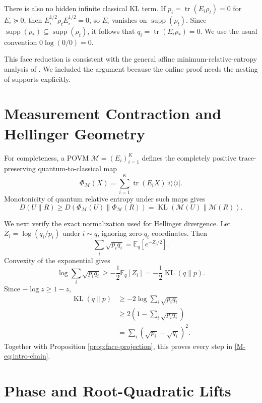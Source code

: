 \documentclass[twoside]{article}
\newcommand{\M}{\mathcal M}
\newcommand{\tr}{\operatorname{tr}}
\newcommand{\supp}{\operatorname{supp}}
\newcommand{\KL}{\operatorname{KL}}
\begin{document}
There is also no hidden infinite classical KL term. If $p_i=\tr(E_i\rho_t)=0$ for $E_i\succeq0$, then $E_i^{1/2}\rho_tE_i^{1/2}=0$, so $E_i$ vanishes on $\supp(\rho_t)$. Since $\supp(\rho_*)\subseteq\supp(\rho_t)$, it follows that $q_i=\tr(E_i\rho_*)=0$. We use the usual convention $0\log(0/0)=0$.

This face reduction is consistent with the general affine minimum-relative-entropy analysis of \citet{zorzi2014minimum}. We included the argument because the online proof needs the nesting of supports explicitly.

\section{Measurement Contraction and Hellinger Geometry}
\label{app:hellinger}

For completeness, a POVM $\M=(E_i)_{i=1}^K$ defines the completely positive trace-preserving quantum-to-classical map
\begin{equation}
\Phi_{\M}(X)=\sum_{i=1}^K\tr(E_iX)|i\rangle\langle i|.
\end{equation}
Monotonicity of quantum relative entropy under such maps gives
\begin{equation}
D(U\|R)\geq D(\Phi_{\M}(U)\|\Phi_{\M}(R))
=\KL(\M(U)\|\M(R)).
\end{equation}

We next verify the exact normalization used for Hellinger divergence. Let $Z_i=\log(q_i/p_i)$ under $i\sim q$, ignoring zero-$q_i$ coordinates. Then
\begin{equation}
\sum_i\sqrt{p_iq_i}=\mathbb E_q[e^{-Z_i/2}].
\end{equation}
Convexity of the exponential gives
\begin{equation}
\log\sum_i\sqrt{p_iq_i}\geq-\frac12\mathbb E_q[Z_i]
=-\frac12\KL(q\|p).
\end{equation}
Since $-\log z\geq1-z$,
\begin{align}
\KL(q\|p)&\geq-2\log\sum_i\sqrt{p_iq_i}\\
&\geq2\left(1-\sum_i\sqrt{p_iq_i}\right)\\
&=\sum_i(\sqrt{p_i}-\sqrt{q_i})^2.
\end{align}
Together with Proposition \ref{prop:face-projection}, this proves every step in \eqref{M-eq:intro-chain}.

\section{Phase and Root-Quadratic Lifts}
\label{app:lifts}
\end{document}
